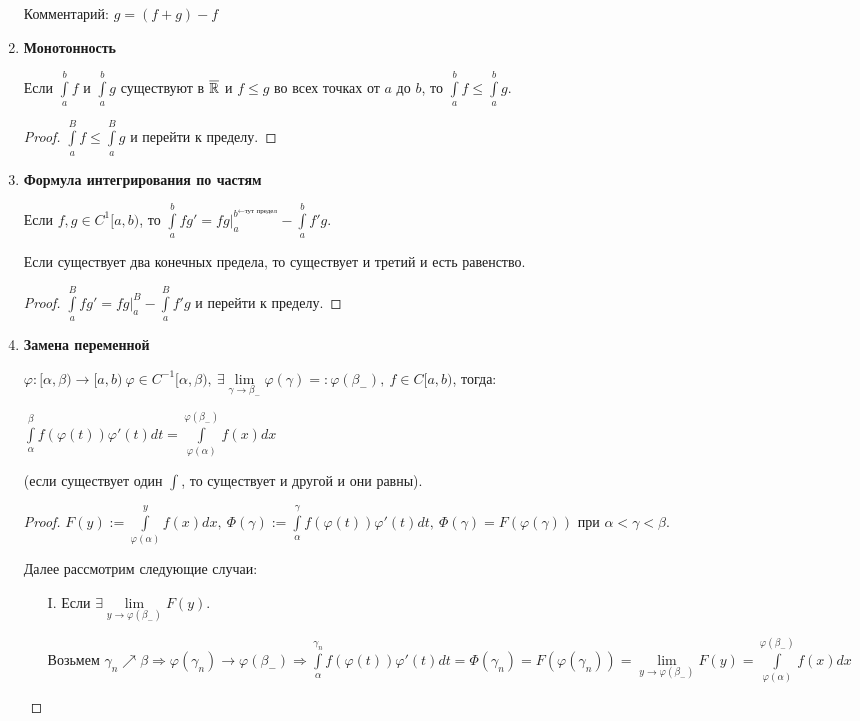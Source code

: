 \begin{statement}
\begin{enumerate}
        Комментарий: $g=(f+g)-f$
        \item \textbf{Монотонность}
        
        Если $\int\limits_a^b f$ и $\int\limits_a^b g$ существуют в $\overline{\mathbb{R}}$ и $f\leq g$ во всех точках от $a$ до $b$, то $\int\limits_a^b f \leq \int\limits_a^b g$.
        \begin{proof}
            $\int\limits_a^B f\leq \int\limits_a^B g$ и перейти к пределу.
        \end{proof}
        \item \textbf{Формула интегрирования по частям}

        Если $f, g\in C^{1}[a, b)$, то $\int\limits_a^b fg' = fg\left.\right|_a^{b^{\leftarrow\text{тут предел}}}-\int\limits_a^bf'g$.

        Если существует два конечных предела, то существует и третий и есть равенство.
        \begin{proof}
            $\int\limits_a^B fg' = fg\left.\right|_a^B-\int\limits_a^Bf'g$ и перейти к пределу.
        \end{proof}
        \item \textbf{Замена переменной}

        $\varphi: [\alpha, \beta)\rightarrow [a, b) \ \varphi\in C^{-1}[\alpha, \beta),\ \exists \lim\limits_{\gamma \rightarrow \beta_-}\varphi(\gamma)=:\varphi(\beta_-),\ f\in C[a, b)$, тогда:

        $\int\limits_\alpha^\beta f(\varphi(t))\varphi'(t)dt=\int\limits_{\varphi(\alpha)}^{\varphi(\beta_-)}f(x)dx$ 
        
        (если существует один $\int$, то существует и другой и они равны).

        \begin{proof}
            $F(y):=\int\limits_{\varphi(\alpha)}^y f(x)dx,\ \Phi(\gamma):=\int\limits_\alpha^\gamma f(\varphi(t))\varphi'(t)dt,\ \Phi(\gamma)=F(\varphi(\gamma))$ при $\alpha<\gamma<\beta$.

            Далее рассмотрим следующие случаи: 
            \begin{enumerate}
                \item[I.] Если $\exists \lim\limits_{y\rightarrow \varphi (\beta_-)} F(y)$.

                Возьмем $\gamma_n\nearrow \beta\Rightarrow \varphi(\gamma_n)\rightarrow \varphi(\beta_-)\Rightarrow \int\limits_{\alpha}^{\gamma_n}f(\varphi(t))\varphi'(t)dt=\Phi (\gamma_n)=F(\varphi(\gamma_n))=\lim\limits_{y\rightarrow \varphi(\beta_-)} F(y)=\int\limits_{\varphi(\alpha)}^{\varphi(\beta_-)}f(x)dx$


\end{enumerate}
\end{proof}
\end{enumerate}
\end{statement}
